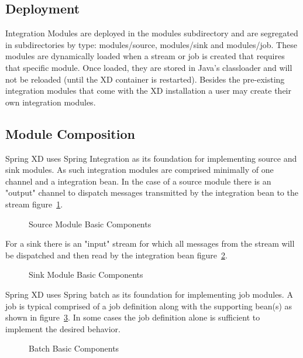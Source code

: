\subsection{Deployment}
Integration Modules are deployed in the modules subdirectory and are segregated in 
subdirectories by type: modules/source, modules/sink and modules/job.  
These modules are dynamically loaded when a stream or job is created that requires that 
specific module.  Once loaded, they are stored in Java's classloader and will not be 
reloaded (until the XD container is restarted).  Besides the pre-existing integration 
modules that come with the XD installation a user may create their own integration 
modules. \par
\subsection{Module Composition}
Spring XD uses Spring Integration \cite{spring-integration-reference} as its foundation 
for implementing source and sink modules.  As such integration modules are 
comprised minimally of one channel and a integration bean.  In the case of a source module 
there is an "output" channel to dispatch messages transmitted by the integration bean to 
the stream figure~\ref{fig:sourcembc}. \par
\begin{figure}[ht]
\centering
{}
\caption{Source Module Basic Components}
\label{fig:sourcembc}
\end{figure}
 For a sink there is an "input" stream for which all messages from the stream will be 
 dispatched and then read by the integration bean figure~\ref{fig:sinkmbc}. \par
\begin{figure}
\centering
{}
\caption{Sink Module Basic Components}
\label{fig:sinkmbc}
\end{figure}
Spring XD uses Spring batch \cite{spring-batch-reference} as its foundation for implementing
job modules. A job is typical comprised of a job definition along with the supporting 
bean(s) as shown in figure~\ref{fig:batchmbc}.
In some cases the job definition alone is sufficient to implement the desired behavior.\par
\begin{figure}
\centering
{}
\caption{Batch Basic Components}
\label{fig:batchmbc}
\end{figure}


